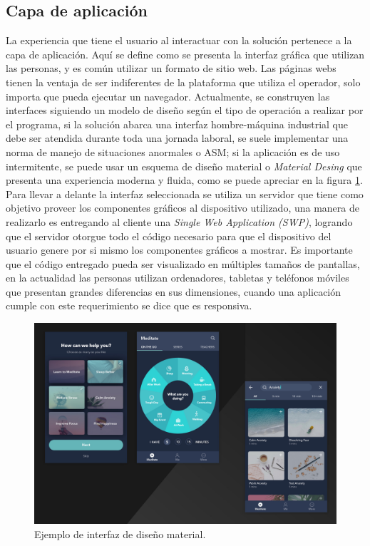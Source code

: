 \subsection{Capa de aplicación}
La experiencia que tiene el usuario al interactuar con la solución pertenece a la capa de aplicación.
Aquí se define como se presenta la interfaz gráfica que utilizan las personas, y es común utilizar un formato de sitio web.
Las páginas webs tienen la ventaja de ser indiferentes de la plataforma que utiliza el operador, solo importa que pueda ejecutar un navegador.
Actualmente, se construyen las interfaces siguiendo un modelo de diseño según el tipo de operación a realizar por el programa, si la solución abarca una interfaz hombre-máquina industrial que debe ser atendida durante toda una jornada laboral, se suele implementar una norma de manejo de situaciones anormales o ASM; si la aplicación es de uso intermitente, se puede usar un esquema de diseño material o \emph{Material Desing} que presenta una experiencia moderna y fluida, como se puede apreciar en la figura \ref{fig:ch1MaterialDesign}.
Para llevar a delante la interfaz seleccionada se utiliza un servidor que tiene como objetivo proveer los componentes gráficos al dispositivo utilizado, una manera de realizarlo es entregando al cliente una \emph{Single Web Application (SWP)}, logrando que el servidor otorgue todo el código necesario para que el dispositivo del usuario genere por si mismo los componentes gráficos a mostrar.
Es importante que el código entregado pueda ser visualizado en múltiples tamaños de pantallas, en la actualidad las personas utilizan ordenadores, tabletas y teléfonos móviles que presentan grandes diferencias en sus dimensiones, cuando una aplicación cumple con este requerimiento se dice que es responsiva.

\begin{figure}[h]
	\centering
	\includegraphics[width=\textwidth]{./Figures/ch1MaterialDesign.jpg}
	\caption{Ejemplo de interfaz de diseño material. \citep{WEBSITE:Material}}
	\label{fig:ch1MaterialDesign}
\end{figure}

